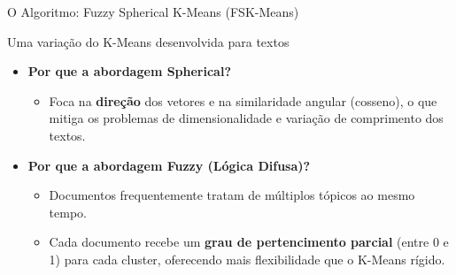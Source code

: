 \documentclass[aspectratio=43]{beamer}
\begin{document}
\begin{frame}[t]{O Algoritmo: Fuzzy Spherical K-Means (FSK-Means)}

\vspace{0.25cm}
\textcolor{uelgreen}{\large Uma variação do K-Means desenvolvida para textos}

\vspace{0.4cm}

\begin{itemize}
    \item \textbf{Por que a abordagem Spherical?}
    \begin{itemize}
        \item Foca na \textbf{direção} dos vetores e na similaridade angular (cosseno), o que mitiga os problemas de dimensionalidade e variação de comprimento dos textos.
    \end{itemize}
    
    \vspace{0.2cm}
    
    \item \textbf{Por que a abordagem Fuzzy (Lógica Difusa)?}
    \begin{itemize}
        \item Documentos frequentemente tratam de múltiplos tópicos ao mesmo tempo.
        \item Cada documento recebe um \textbf{grau de pertencimento parcial} (entre 0 e 1) para cada cluster, oferecendo mais flexibilidade que o K-Means rígido.
    \end{itemize}
\end{itemize}

\end{frame}
\end{document}
